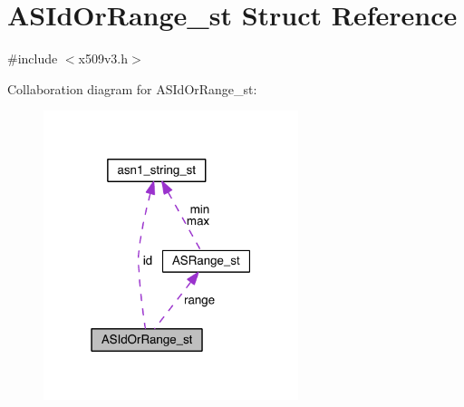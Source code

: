 \hypertarget{struct_a_s_id_or_range__st}{}\section{A\+S\+Id\+Or\+Range\+\_\+st Struct Reference}
\label{struct_a_s_id_or_range__st}


{\ttfamily \#include $<$x509v3.\+h$>$}



Collaboration diagram for A\+S\+Id\+Or\+Range\+\_\+st\+:\nopagebreak
\begin{figure}[H]
\begin{center}
\leavevmode
\includegraphics[width=211pt]{struct_a_s_id_or_range__st__coll__graph}
\end{center}
\end{figure}
